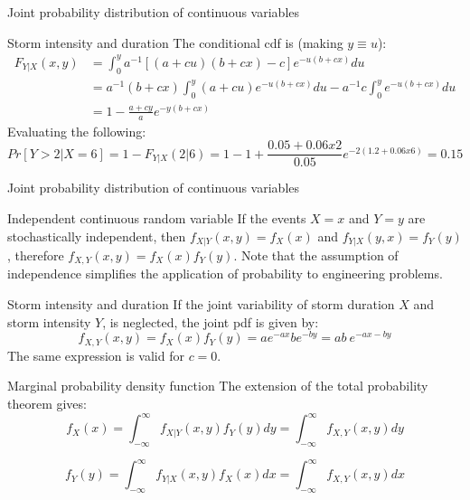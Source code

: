 \documentclass[8pt]{beamer}
\renewcommand{\emph}[1]{\textcolor{myorange}{#1}}
\begin{document}
\begin{frame}{Joint probability distribution of continuous variables}
    \begin{exampleblock}{Storm intensity and duration}
        The conditional cdf is (making $y \equiv u$):
         \begin{align*}
             \displaystyle
             F_{Y|X} (x,y) &= \int_0^y a^{-1}\left[ (a+cu)(b+cx)-c \right]e^{-u(b+cx)} du\\
            &= a^{-1}(b+cx)\int_0^y (a + cu)e^{-u(b+cx)}du -a^{-1} c \int_0^y  e^{-u(b+cx)}du \\
            &= 1-\frac{a+cy}{a}e^{-y(b+cx)}
        \end{align*}
        Evaluating the following:
\[
    Pr[Y> 2 | X=6] = 1- F_{Y|X} (2|6) = 1 - 1 + \frac{0.05 + 0.06 x 2}{0.05} e^{-2(1.2+0.06 x 6)} = 0.15
\]
    \end{exampleblock}
\end{frame}

\begin{frame}{Joint probability distribution of continuous variables}
    \begin{block}{Independent continuous random variable}
        If the events $X=x$ and $Y=y$ are stochastically independent, then $f_{X|Y} (x,y) = f_X (x)$ and $f_{Y|X} (y,x) = f_Y (y)$, therefore $f_{X,Y} (x,y) = f_X (x) f_Y (y)$. 
        Note that the assumption of independence simplifies the application of probability to engineering problems. 
    \end{block}
    
    \begin{exampleblock}{Storm intensity and duration}
        If the joint variability of storm duration  $X$ and storm intensity $Y$, is neglected, the joint \emph{pdf} is given by:
        \[
            f_{X,Y} (x,y) = f_X (x) f_Y (y) = a e^{-ax} b e^{-by} = ab \ e^{-ax-by}
        \]
        The same expression is valid for $c=0$.
    \end{exampleblock}
    \begin{block}{Marginal probability density function}
        The extension of the \emph{total probability theorem} gives:
        \[
            \displaystyle
            f_X (x) = \int_{-\infty}^{\infty} f_{X|Y} (x,y) f_Y (y) dy = \int_{-\infty}^{\infty} f_{X,Y} (x,y) dy
        \]

        \[
            \displaystyle
            f_Y (y) = \int_{-\infty}^{\infty} f_{Y|X} (x,y) f_X (x) dx = \int_{-\infty}^{\infty} f_{X,Y} (x,y) dx
        \]
    \end{block}
\end{frame}
\end{document}

